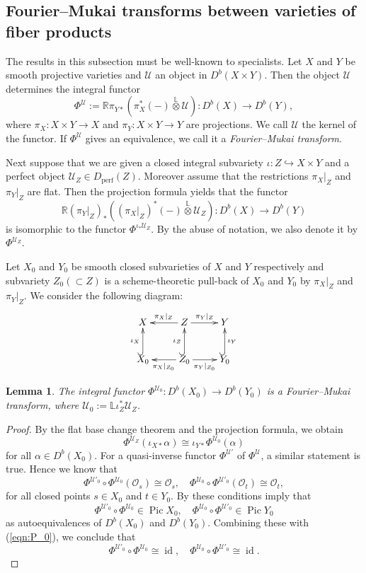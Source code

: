 \documentclass[a4paper,11pt]{article}
\newtheorem{lem}[thm]{Lemma}
\theoremstyle{definition}\newtheorem{defn}[thm]{Definition}
\theoremstyle{remark}\newtheorem{remark}[thm]{Remark}
\numberwithin{equation}{section}
\newcommand{\RR}{\ensuremath{\mathbb{R}}}
\newcommand{\LL}{\ensuremath{\mathbb{L}}}
\newcommand{\ltensor}{\overset{\LL}{\otimes}}
\newcommand{\Pic}{\ensuremath{\operatorname{Pic}}}
\newcommand{\id}{\ensuremath{\operatorname{id}}}
\newcommand{\mc}{\mathcal}
\newcommand{\fm}[1]{\ensuremath{\Phi^{#1}}}
\newcommand{\perf}{\operatorname{perf}}
\begin{document}
\subsection{Fourier--Mukai transforms between varieties of fiber products}
The results in this subsection  must be well-known to specialists.
Let $X$ and $Y$ be smooth projective varieties and
$\mc U$ an object in $D^b(X\times Y)$.
Then the object $\mc U$ determines the integral functor
$$
\fm{\mc U}:=\RR\pi _{Y*}(\pi^*_X(-)\ltensor \mc U)\colon D^b(X)\to D^b(Y),
$$
where $\pi_X\colon X\times Y\to X$ and $\pi_Y\colon X\times Y \to Y$
are projections.
We call $\mc U$ the kernel of the functor.
If $\fm{\mc U}$ gives an equivalence, 
we call it a \emph{Fourier--Mukai transform}. 

Next suppose that we are given a closed integral subvariety 
$\iota \colon Z\hookrightarrow  X\times Y$
and a perfect object $\mc U_Z\in D_{\perf}(Z)$. 
Moreover assume that the restrictions 
$\pi_X |_Z$ and $\pi_Y|_Z$ are flat.
Then the projection formula yields that the functor 
$$
\RR(\pi _{Y}|_Z)_*((\pi_X|_Z)^*(-)\ltensor \mc U_Z)\colon D^b(X)\to D^b(Y)
$$
is isomorphic to the functor
$\fm{\iota_*\mc U_Z}$.
By the abuse of notation, we also denote it by 
$\fm{\mc U_Z}$.
 
Let $X_0$ and $Y_0$ be smooth closed subvarieties of $X$ and $Y$ 
respectively and subvariety $Z_0(\subset Z)$ is 
a scheme-theoretic pull-back of $X_0$ and $Y_0$ by $\pi_X|_Z$ and $\pi_Y|_Z$.
We consider the following diagram:
%
%
\[ 
\xymatrix{ 
X  &    Z \ar[l]_{\pi_X|_{Z}} \ar[r]^{\pi_Y|_{Z}}  & Y    \\
X_0 
\ar@{^{(}->}[u]^{\iota_X} &  Z_0 \ar[l]^{\pi_X|_{Z_0}} \ar[r]_{\pi_Y|_{Z_0}}
\ar@{^{(}->}[u]^{\iota_Z} & Y_0 
\ar@{^{(}->}[u]_{\iota_Y} \\ 
}\]


\begin{lem}\label{lem:flatprojection}
The integral functor 
$\fm{\mc U_0}\colon D^b(X_0)\to D^b(Y_0)$
is a Fourier--Mukai transform, where $\mc U_0:=\LL\iota_Z^* \mc U_Z$. 
\end{lem}   

\begin{proof}
By the flat base change theorem
and the projection formula, we obtain
%
\begin{equation}\label{eqn:P_0}
\fm{\mc U_Z}(\iota_{X*} \alpha)\cong \iota_{Y*}\fm{\mc U_0}(\alpha)
\end{equation}
%
for all $\alpha \in D^b(X_0)$.
For a quasi-inverse functor $\fm{\mc U'}$ of $\fm{\mc U}$,
a similar statement is true. Hence
we know that 
$$\fm{\mc U'_0}\circ \fm{\mc U_0}(\mc O_s)\cong \mc O_s, \quad
\fm{\mc U_0}\circ \fm{\mc U'_0}(\mc O_t)\cong \mc O_t, 
$$ 
for all closed points $s\in X_0$ and $t\in Y_0$.
By \cite[3.3]{BM98} these conditions imply that 
$$
\fm{\mc U'_0}\circ \fm{\mc U_0}\in \Pic X_0, \quad
\fm{\mc U_0}\circ \fm{\mc U'_0}\in \Pic Y_0
$$
as autoequivalences of $D^b(X_0)$ and $D^b(Y_0)$.
Combining these with (\ref{eqn:P_0}), we conclude that 
$$
\fm{\mc U'_0}\circ \fm{\mc U_0}\cong \id,\quad 
\fm{\mc U_0}\circ \fm{\mc U'_0}\cong \id.
$$
\end{proof}
\end{document}
